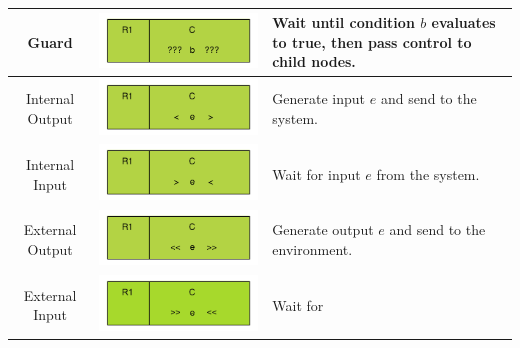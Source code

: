 \documentclass[]{article}
\begin{document}
\begin{tabularx}{\textwidth}{|c|c|X|}
Guard &\includegraphics{figs/AppendixB/BasicNodes/Guard} & Wait until condition $b$ evaluates to true, then pass control to child nodes.\\ \hline
Internal Output &\includegraphics{figs/AppendixB/BasicNodes/IOEvent}  & Generate input $e$ and send to the system.\\ \hline
Internal Input &\includegraphics{figs/AppendixB/BasicNodes/IIEvent} & Wait for input $e$ from the system.\\ \hline
External Output &\includegraphics{figs/AppendixB/BasicNodes/EOEvent} & Generate output $e$ and send to the environment.\\ \hline
External Input &\includegraphics{figs/AppendixB/BasicNodes/EIEvent} & Wait for

\end{tabularx}
\end{document}
